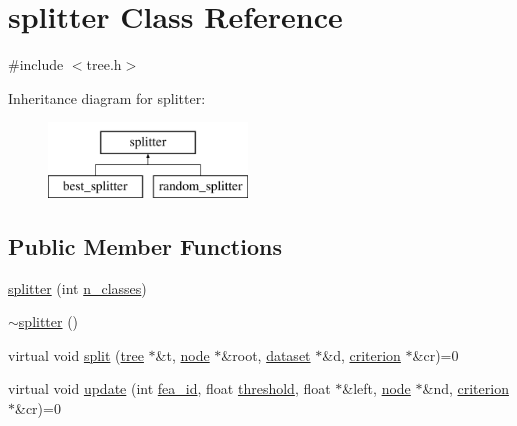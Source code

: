\hypertarget{classsplitter}{\section{splitter Class Reference}
\label{classsplitter}
}


{\ttfamily \#include $<$tree.\+h$>$}

Inheritance diagram for splitter\+:\begin{figure}[H]
\begin{center}
\leavevmode
\includegraphics[height=2.000000cm]{classsplitter}
\end{center}
\end{figure}
\subsection*{Public Member Functions}
\begin{DoxyCompactItemize}
\item 
\hyperlink{classsplitter_aecf4cc04f2ae39a4a8e13d4049d442cf}{splitter} (int \hyperlink{classsplitter_abfc53538ed65c0afd50aedbf46dff458}{n\+\_\+classes})
\item 
\hyperlink{classsplitter_a221bcb6b6705bb240ef6eea0c95f841a}{$\sim$splitter} ()
\item 
virtual void \hyperlink{classsplitter_a5795eaf65be951d241ad697e20fb2120}{split} (\hyperlink{classtree}{tree} $\ast$\&t, \hyperlink{classnode}{node} $\ast$\&root, \hyperlink{classdataset}{dataset} $\ast$\&d, \hyperlink{classcriterion}{criterion} $\ast$\&cr)=0
\item 
virtual void \hyperlink{classsplitter_ab2ea956cc1a10ebb39422fa5ac450af2}{update} (int \hyperlink{classsplitter_ad093754efc111ae9dcb00e844b91e979}{fea\+\_\+id}, float \hyperlink{classsplitter_af40121f8411ad94f3f1968b1d50905ed}{threshold}, float $\ast$\&left, \hyperlink{classnode}{node} $\ast$\&nd, \hyperlink{classcriterion}{criterion} $\ast$\&cr)=0
\end{DoxyCompactItemize}
